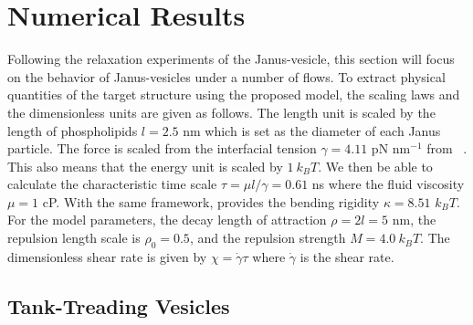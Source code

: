 \documentclass[lineno]{jfm}
\begin{document}
\section{\label{results}Numerical Results}


Following the relaxation experiments of the Janus-vesicle, this section will focus on the behavior of 
Janus-vesicles under a number of flows. To extract physical quantities of the target structure using the
proposed model, the scaling laws and the dimensionless units are given as follows.
The length unit is scaled by the length of phospholipids $l=2.5$ nm which is set as the diameter of each 
Janus particle. The force is scaled from the interfacial tension $\gamma=4.11$ pN nm$^{-1}$ 
from ~\cite{Ryham16}. This also means that the energy unit is scaled by $1\ k_BT$. We then be able to
calculate the characteristic time scale $\tau = \mu l/\gamma = 0.61$ ns where the fluid viscosity $\mu=1$ cP.
With the same framework, \cite{Fu20} provides the bending rigidity $\kappa=8.51$ $k_BT$.
%
For the model parameters, the decay length of attraction $\rho = 2l = 5$ nm, the repulsion length scale is 
$\rho_0=0.5$, and the repulsion strength $M=4.0\ k_BT$.
The dimensionless shear rate is given by $\chi = \dot\gamma \tau$ where $\dot\gamma$ is the shear rate.





\subsection{Tank-Treading Vesicles}

\end{document}
